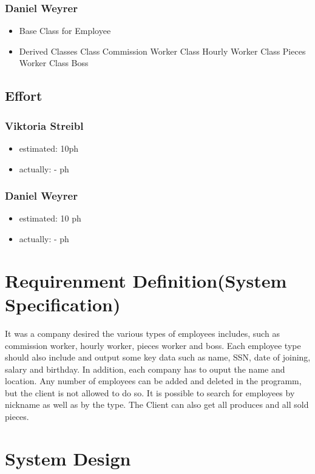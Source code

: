 \subsubsection{Daniel Weyrer}
\begin{itemize}
	\item Base Class for Employee
	\item Derived Classes
		\subitem Class Commission Worker
		\subitem Class Hourly Worker
		\subitem Class Pieces Worker
		\subitem Class Boss
\end{itemize}

\subsection{Effort}

\subsubsection {Viktoria Streibl}
\begin{itemize}
	\item estimated: 10ph 
	\item actually: - ph
\end{itemize}

\subsubsection {Daniel Weyrer}
\begin{itemize}
	\item estimated: 10 ph 
	\item actually: - ph
\end{itemize}

\section{Requirenment Definition(System Specification)}
It was a company desired the various types of employees includes, such as commission worker, hourly worker, pieces worker and boss. Each employee type should also include and output some key data such as name, SSN, date of joining, salary and birthday. In addition, each company has to ouput the name and location.
Any number of employees can be added and deleted in the programm, but the client is not allowed to do so. It is possible to search for employees by nickname as well as by the type. The Client can also get all produces and all sold pieces.

\section{System Design}
